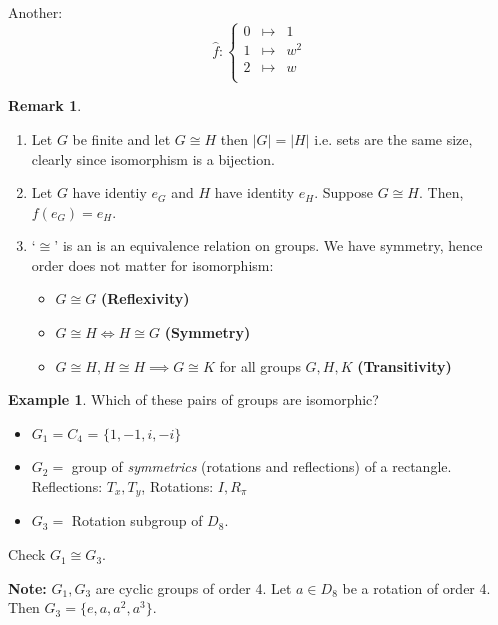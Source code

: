 \documentclass{article}
\theoremstyle{definition}
\newtheorem*{remark}{Remark}
\newtheorem*{exmp}{Example}
\newcommand{\ism}{\cong}
\begin{document}
Another:
\begin{equation*}
  \hat{f} : \left\{
       \begin{matrix}
        0 & \mapsto & 1 \\
        1 & \mapsto & w^2 \\
        2 & \mapsto & w \\
      \end{matrix} 
      \right.
 \end{equation*}
 
\begin{remark}\hfill
\begin{enumerate}
  \item Let $G$ be finite and let $G \ism H$ then $|G|=|H|$ i.e. sets are the same size, clearly since isomorphism is a bijection.
  \item Let $G$ have identiy $e_G$ and $H$ have identity $e_H$. Suppose $G \ism H$. Then, $f(e_G)=e_H$.
  \item `$\ism$' is an is an equivalence relation on groups.
   We have symmetry, hence order does not matter for isomorphism:
    \begin{itemize}
      \item$G \ism G $ \textbf{(Reflexivity)}
      \item$G \ism H \iff H \ism G$ \textbf{(Symmetry)}
      \item $G \ism H, H \ism H \implies G \ism K $ for all groups $G,H,K$\textbf{ (Transitivity)}\\
    \end{itemize}
\end{enumerate}
\end{remark}

\begin{exmp}
Which of these pairs of groups are isomorphic?
\begin{itemize}
  \item 
$G_1 = C_4$ = $\{1,-1,i,-i\}$
  \item
$G_2 = $ group of \emph{symmetrics} (rotations and reflections) of a rectangle.\\
Reflections: $T_x, T_y$, Rotations: $I, R_\pi$
  \item $G_3 = $ Rotation subgroup of $D_8$.
\end{itemize}
  
Check $G_1 \ism G_3$.
\end{exmp}

\textbf{Note:} $G_1, G_3$ are cyclic groups of order 4. Let $a \in D_8$ be a rotation of order 4. 
Then $G_3 = \{e,a,a^2, a^3\}$.\hfill\\
\end{document}
